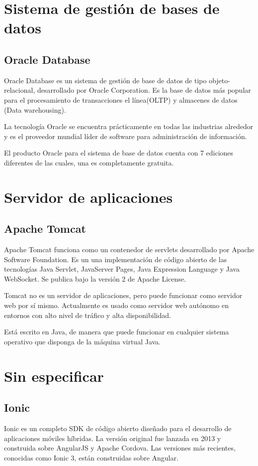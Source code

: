 \section{Sistema de gestión de bases de datos}
\subsection{Oracle Database}
Oracle Database es un sistema de gestión de base de datos de tipo objeto-relacional, desarrollado por Oracle Corporation. Es la base de datos más popular para el procesamiento de transacciones el línea(OLTP) y almacenes de datos (Data warehousing).

La tecnología Oracle se encuentra prácticamente en todas las industrias alrededor y es el proveedor mundial líder de software para administración de información.

El producto Oracle para el sistema de base de datos cuenta con 7 ediciones diferentes de las cuales, una es completamente gratuita.

\section{Servidor de aplicaciones}
\subsection{Apache Tomcat}
Apache Tomcat funciona como un contenedor de servlets desarrollado por Apache Software Foundation. Es un una implementación de código abierto de las tecnologías Java Servlet, JavaServer Pages, Java Expression Language y Java WebSocket. Se publica bajo la versión 2 de Apache License.

Tomcat no es un servidor de aplicaciones, pero puede funcionar como servidor web por sí mismo. Actualmente es usado como servidor web autónomo en entornos con alto nivel de tráfico y alta disponibilidad.

Está escrito en Java, de manera que puede funcionar en cualquier sistema operativo que disponga de la máquina virtual Java.



\section{Sin especificar}
\subsection{Ionic}
Ionic es un completo SDK de código abierto diseñado para el desarrollo de aplicaciones móviles híbridas. La versión original fue lanzada en 2013 y construida sobre AngularJS y Apache Cordova. Las versiones más recientes, conocidas como Ionic 3, están construidas sobre Angular.

